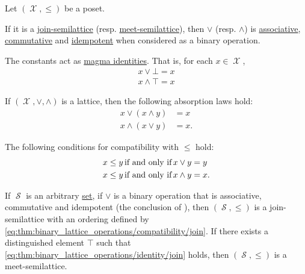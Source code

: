 \begin{proposition}\label{thm:binary_lattice_operations}
  Let \( (\mscrX, \leq) \) be a poset.

  \begin{thmenum}
     If it is a \hyperref[def:semilattice/join]{join-semilattice} (resp. \hyperref[def:semilattice/meet]{meet-semilattice}), then \( \vee \) (resp. \( \wedge \)) is \hyperref[def:magma/associative]{associative}, \hyperref[def:magma/commutative]{commutative} and \hyperref[def:magma/idempotent]{idempotent} when considered as a binary operation.

     The constants act as \hyperref[def:magma_identity]{magma identities}. That is, for each \( x \in \mscrX \),
    \begin{align}
      x \vee \bot = x \label{eq:thm:binary_lattice_operations/identity/join} \\
      x \wedge \top = x \label{eq:thm:binary_lattice_operations/identity/meet}
    \end{align}

     If \( (\mscrX, \vee, \wedge) \) is a lattice, then the following absorption laws hold:
    \begin{align}
      x \vee (x \wedge y) &= x \label{eq:thm:binary_lattice_operations/absorption/join} \\
      x \wedge (x \vee y) &= x \label{eq:thm:binary_lattice_operations/absorption/meet}.
    \end{align}

     The following conditions for compatibility with \( \leq \) hold:
    \begin{align}
      x \leq y &\T{if and only if} x \vee y = y \label{eq:thm:binary_lattice_operations/compatibility/join} \\
      x \leq y &\T{if and only if} x \wedge y = x \label{eq:thm:binary_lattice_operations/compatibility/meet}.
    \end{align}

     If \( \mscrS \) is an arbitrary \hyperref[def:set_zfc]{set}, if \( \vee \) is a binary operation that is associative, commutative and idempotent (the conclusion of ), then \( (\mscrS, \leq) \) is a join-semilattice with an ordering defined by \eqref{eq:thm:binary_lattice_operations/compatibility/join}. If there exists a distinguished element \( \top \) such that \eqref{eq:thm:binary_lattice_operations/identity/join} holds, then \( (\mscrS, \leq) \) is a meet-semilattice.


\end{thmenum}
\end{proposition}
